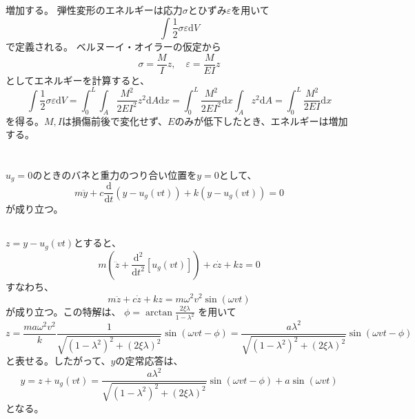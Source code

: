\documentclass[a4paper]{jsarticle}
\begin{document}
\subsection{}
増加する。
弾性変形のエネルギーは応力$\sigma$とひずみ$\varepsilon$を用いて
\begin{equation}
  \int \frac{1}{2} \sigma \varepsilon \mathrm{d} V
\end{equation}
で定義される。
ベルヌーイ・オイラーの仮定から
\begin{equation}
  \sigma = \frac{M}{I} z, \quad
  \varepsilon = \frac{M}{EI} z
\end{equation}
としてエネルギーを計算すると、
\begin{equation}
  \int \frac{1}{2} \sigma \varepsilon \mathrm{d} V
  = \int_0^L \int_A \frac{M^2}{2 E I^2} z^2 \mathrm{d} A \mathrm{d} x
  = \int_0^L \frac{M^2}{2 E I^2} \mathrm{d} x \int_A z^2 \mathrm{d} A
  = \int_0^L \frac{M^2}{2 E I} \mathrm{d} x
\end{equation}
を得る。$M,I$は損傷前後で変化せず、$E$のみが低下したとき、エネルギーは増加する。

\section{}
\subsection{}
$u_g = 0$のときのバネと重力のつり合い位置を$y = 0$として、
\begin{equation}
  m \ddot{y} + c \frac{\mathrm{d}}{\mathrm{d} t} \left(y - u_g(v t)\right)
  + k \left(y - u_g(v t)\right) = 0
\end{equation}
が成り立つ。

\subsection{}
$z = y - u_g(vt)$とすると、
\begin{equation}
  m \left(\ddot{z} + \frac{\mathrm{d}^2}{\mathrm{d} t^2} [u_g(vt)]\right)
  + c \dot{z} + k z = 0
\end{equation}
すなわち、
\begin{equation}
  m \ddot{z} + c \dot{z} + k z = m \omega^2 v^2 \sin (\omega v t)
\end{equation}
が成り立つ。この特解は、
$\phi = \arctan \frac{2 \xi \lambda}{1 - \lambda^2}$
を用いて
\begin{equation}
  z = \frac{m a \omega^2 v^2}{k}
  \frac{1}{\sqrt{(1 - \lambda^2)^2 + (2 \xi \lambda)^2}}
  \sin (\omega v t - \phi)
  = \frac{a \lambda^2}{\sqrt{(1 - \lambda^2)^2 + (2 \xi \lambda)^2}}
  \sin (\omega v t - \phi)
\end{equation}
と表せる。したがって、$y$の定常応答は、
\begin{equation}
  y = z + u_g(vt)
  = \frac{a \lambda^2}{\sqrt{(1 - \lambda^2)^2 + (2 \xi \lambda)^2}}
  \sin (\omega v t - \phi) + a \sin (\omega v t)
\end{equation}
となる。
\end{document}

